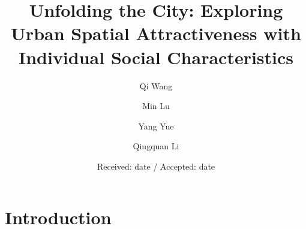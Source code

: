 \title{Unfolding the City: Exploring Urban Spatial Attractiveness with Individual Social Characteristics}



\author{Qi Wang \and Min Lu \and Yang Yue \and Qingquan Li}



\date{Received: date / Accepted: date}


\maketitle

\begin{abstract}

\end{abstract}

\section{Introduction}

